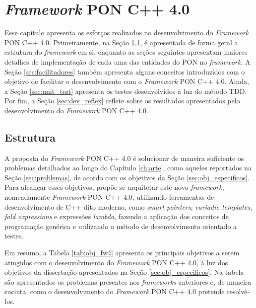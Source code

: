 \chapter{\textit{Framework} PON C++
4.0}\label{ch:desenvolvimento}\label{sec:fw4_dev}

Esse capítulo apresenta os esforços realizados no desenvolvimento do
\textit{Framework} PON C++ 4.0. Primeiramente, na Seção \ref{sec:estrutura_fw4},
é apresentada de forma geral a estrutura do \textit{framework} em si, enquanto
as seções seguintes apresentam maiores detalhes de implementação de cada uma das
entidades do PON no \textit{framework}. A Seção \ref{sec:facilitadores}
também apresenta alguns conceitos introduzidos com o objetivo de facilitar o
desenvolvimento com o \textit{Framework} PON C++ 4.0. Ainda, a Seção
\ref{sec:unit_test} apresenta os testes desenvolvidos à luz do método
TDD. Por fim, a Seção \ref{sec:dev_reflex} reflete sobre os resultados
apresentados pelo desenvolvimento do \textit{Framework} PON C++ 4.0.

\section{Estrutura}\label{sec:estrutura_fw4}

A proposta do \textit{Framework} PON C++ 4.0 é solucionar de maneira suficiente
os problemas detalhados ao longo do Capítulo \ref{ch:arte}, como aqueles
reportados na Seção \ref{sec:problemas}, de acordo com os objetivos da Seção
\ref{sec:obj_especificos}. Para alcançar esses objetivos, propõe-se arquitetar
este novo \textit{framework}, nomeadamente \textit{Framework} PON C++ 4.0,
utilizando ferramentas de desenvolvimento de C++ dito moderno, como
\textit{smart pointers}, \textit{variadic templates}, \textit{fold expressions}
e expressões \textit{lambda}, fazendo a aplicação dos conceitos de programação
genérica e utilizando o método de desenvolvimento orientado a testes. 

Em resumo, a Tabela \ref{tab:obj_fw4} apresenta os principais objetivos a serem
atingidos com o desenvolvimento do \textit{Framework} PON C++ 4.0, à luz dos
objetivos da dissertação apresentados na Seção \ref{sec:obj_especificos}. Na
tabela são apresentados os problemas presentes nos \textit{frameworks}
anteriores e, de maneira sucinta, como o desenvolvimento do \textit{Framework}
PON C++ 4.0 pretende resolvê-los.

